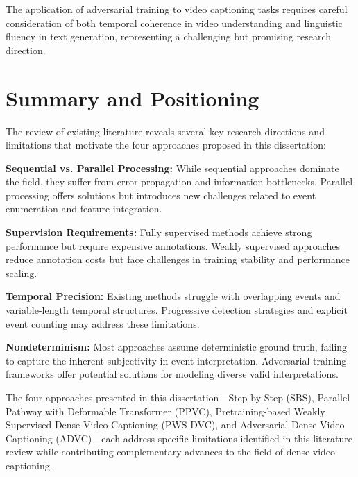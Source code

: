 The application of adversarial training to video captioning tasks requires careful consideration of both temporal coherence in video understanding and linguistic fluency in text generation, representing a challenging but promising research direction.

\section{Summary and Positioning}
\label{sec:summary_positioning}

The review of existing literature reveals several key research directions and limitations that motivate the four approaches proposed in this dissertation:

\textbf{Sequential vs. Parallel Processing:} While sequential approaches dominate the field, they suffer from error propagation and information bottlenecks. Parallel processing offers solutions but introduces new challenges related to event enumeration and feature integration.

\textbf{Supervision Requirements:} Fully supervised methods achieve strong performance but require expensive annotations. Weakly supervised approaches reduce annotation costs but face challenges in training stability and performance scaling.

\textbf{Temporal Precision:} Existing methods struggle with overlapping events and variable-length temporal structures. Progressive detection strategies and explicit event counting may address these limitations.

\textbf{Nondeterminism:} Most approaches assume deterministic ground truth, failing to capture the inherent subjectivity in event interpretation. Adversarial training frameworks offer potential solutions for modeling diverse valid interpretations.

The four approaches presented in this dissertation—Step-by-Step (SBS), Parallel Pathway with Deformable Transformer (PPVC), Pretraining-based Weakly Supervised Dense Video Captioning (PWS-DVC), and Adversarial Dense Video Captioning (ADVC)—each address specific limitations identified in this literature review while contributing complementary advances to the field of dense video captioning.